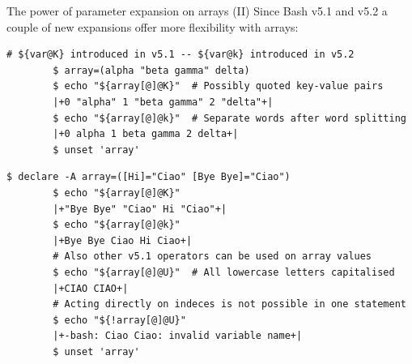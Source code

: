 \begin{frame}[fragile]{The power of parameter expansion on arrays (II)}
    \vspace{-2mm}
    Since Bash v5.1 and v5.2 a couple of new expansions offer more flexibility with arrays:
    \begin{lstlisting}[style=MyBash, aboveskip=3mm, xrightmargin=2mm]
        # ${var@K} introduced in v5.1 -- ${var@k} introduced in v5.2
        $ array=(alpha "beta gamma" delta)
        $ echo "${array[@]@K}"  # Possibly quoted key-value pairs
        |+0 "alpha" 1 "beta gamma" 2 "delta"+|
        $ echo "${array[@]@k}"  # Separate words after word splitting
        |+0 alpha 1 beta gamma 2 delta+|
        $ unset 'array'
    \end{lstlisting}
    \begin{lstlisting}[style=MyBash, aboveskip=3mm, xrightmargin=2mm, firstnumber=8]
        $ declare -A array=([Hi]="Ciao" [Bye Bye]="Ciao")
        $ echo "${array[@]@K}"
        |+"Bye Bye" "Ciao" Hi "Ciao"+|
        $ echo "${array[@]@k}"
        |+Bye Bye Ciao Hi Ciao+|
        # Also other v5.1 operators can be used on array values
        $ echo "${array[@]@U}"  # All lowercase letters capitalised
        |+CIAO CIAO+|
        # Acting directly on indeces is not possible in one statement
        $ echo "${!array[@]@U}"
        |+-bash: Ciao Ciao: invalid variable name+|
        $ unset 'array'
    \end{lstlisting}
\end{frame}




